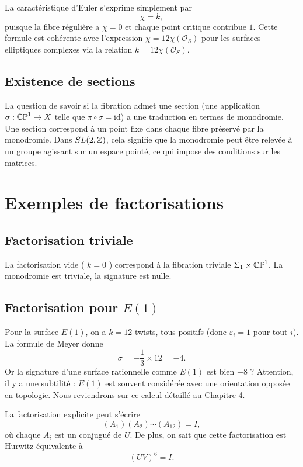 La caractéristique d'Euler s'exprime simplement par
\[
\chi = k,
\]
puisque la fibre régulière a $\chi=0$ et chaque point critique contribue $1$. Cette formule est cohérente avec l'expression $\chi = 12 \chi(\mathcal{O}_S)$ pour les surfaces elliptiques complexes via la relation $k = 12 \chi(\mathcal{O}_S)$.

\subsection{Existence de sections}

La question de savoir si la fibration admet une section (une application $\sigma: \mathbb{CP}^1 \to X$ telle que $\pi \circ \sigma = \mathrm{id}$) a une traduction en termes de monodromie. Une section correspond à un point fixe dans chaque fibre préservé par la monodromie. Dans $SL(2,\mathbb{Z})$, cela signifie que la monodromie peut être relevée à un groupe agissant sur un espace pointé, ce qui impose des conditions sur les matrices.

\section{Exemples de factorisations}

\subsection{Factorisation triviale}

La factorisation vide ( $k=0$ ) correspond à la fibration triviale $\Sigma_1 \times \mathbb{CP}^1$. La monodromie est triviale, la signature est nulle.

\subsection{Factorisation pour $E(1)$}

Pour la surface $E(1)$, on a $k=12$ twists, tous positifs (donc $\varepsilon_i = 1$ pour tout $i$). La formule de Meyer donne
\[
\sigma = -\frac{1}{3} \times 12 = -4.
\]
Or la signature d'une surface rationnelle comme $E(1)$ est bien $-8$ ? Attention, il y a une subtilité : $E(1)$ est souvent considérée avec une orientation opposée en topologie. Nous reviendrons sur ce calcul détaillé au Chapitre 4.

La factorisation explicite peut s'écrire
\[
(A_1)(A_2)\cdots(A_{12}) = I,
\]
où chaque $A_i$ est un conjugué de $U$. De plus, on sait que cette factorisation est Hurwitz-équivalente à
\[
(UV)^6 = I.
\]

